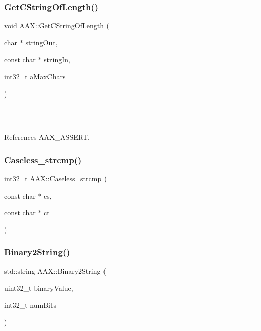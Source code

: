 \subsubsection{\texorpdfstring{GetCStringOfLength()}{GetCStringOfLength()}}
{\footnotesize\ttfamily void A\+A\+X\+::\+Get\+C\+String\+Of\+Length (\begin{DoxyParamCaption}\item[{char $\ast$}]{string\+Out,  }\item[{const char $\ast$}]{string\+In,  }\item[{int32\+\_\+t}]{a\+Max\+Chars }\end{DoxyParamCaption})\hspace{0.3cm}{\ttfamily [inline]}}



============================================================== 



References A\+A\+X\+\_\+\+A\+S\+S\+E\+RT.

\mbox{\label{a00852_a5f092aff54cbd222fda57f5ea0a12189}} 
\subsubsection{\texorpdfstring{Caseless\_strcmp()}{Caseless\_strcmp()}}
{\footnotesize\ttfamily int32\+\_\+t A\+A\+X\+::\+Caseless\+\_\+strcmp (\begin{DoxyParamCaption}\item[{const char $\ast$}]{cs,  }\item[{const char $\ast$}]{ct }\end{DoxyParamCaption})\hspace{0.3cm}{\ttfamily [inline]}}

\mbox{\label{a00852_a690ffc499da04ea963fff3bf8d6174fb}} 
\subsubsection{\texorpdfstring{Binary2String()}{Binary2String()}}
{\footnotesize\ttfamily std\+::string A\+A\+X\+::\+Binary2\+String (\begin{DoxyParamCaption}\item[{uint32\+\_\+t}]{binary\+Value,  }\item[{int32\+\_\+t}]{num\+Bits }\end{DoxyParamCaption})\hspace{0.3cm}{\ttfamily [inline]}}



